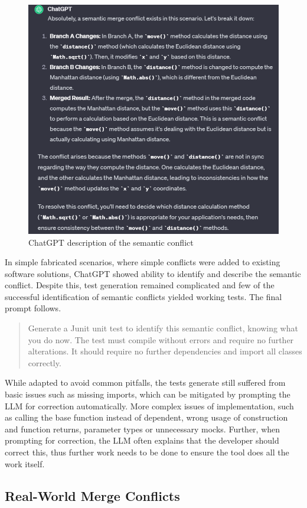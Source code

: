 \begin{figure}
    \centering
    \includegraphics[width=0.75\linewidth]{figures/image.png}
    \caption{ChatGPT description of the semantic conflict}
    \label{fig:semconf}
\end{figure}

In simple fabricated scenarios, where simple conflicts were added to existing software solutions, ChatGPT showed ability to identify and describe the semantic conflict. Despite this, test generation remained complicated and few of the successful identification of semantic conflicts yielded working tests. The final prompt follows.

\begin{quote}
Generate a Junit unit test to identify this semantic conflict, knowing what you do now. The test must compile without errors and require no further alterations. It should require no further dependencies and import all classes correctly.
\end{quote}

While adapted to avoid common pitfalls, the tests generate still suffered from basic issues such as missing imports, which can be mitigated by prompting the LLM for correction automatically. More complex issues of implementation, such as calling the base function instead of dependent, wrong usage of construction and function returns, parameter types or unnecessary mocks. Further, when prompting for correction, the LLM often explains that the developer should correct this, thus further work needs to be done to ensure the tool does all the work itself.

\subsection{Real-World Merge Conflicts}

